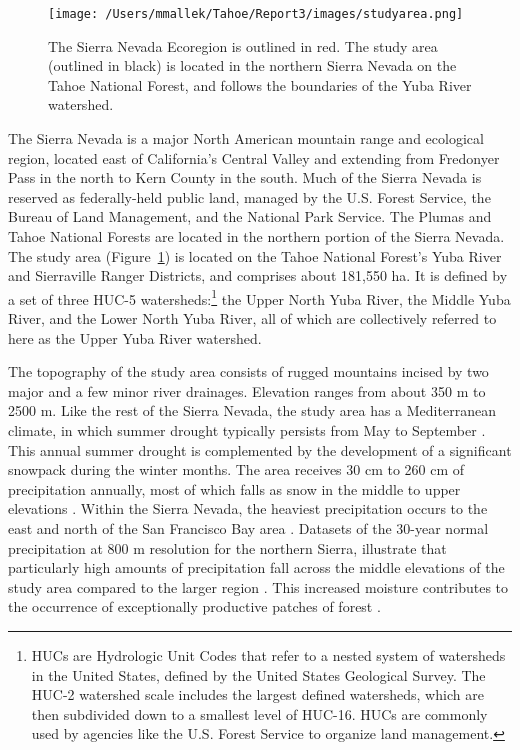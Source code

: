 \begin{figure}[!htbp]
\centering
\texttt{[image: /Users/mmallek/Tahoe/Report3/images/studyarea.png]}
\caption{The Sierra Nevada Ecoregion is outlined in red. The study area (outlined in black) is located in the northern Sierra Nevada on the Tahoe National Forest, and follows the boundaries of the Yuba River watershed.}
\label{projectarea}
\end{figure}

The Sierra Nevada is a major North American mountain range and ecological region, located east of California's Central Valley and extending from Fredonyer Pass in the north to Kern County in the south. Much of the Sierra Nevada is reserved as federally-held public land, managed by the U.S. Forest Service, the Bureau of Land Management, and the National Park Service. The Plumas and Tahoe National Forests are located in the northern portion of the Sierra Nevada. The study area (Figure~\ref{projectarea}) is located on the Tahoe National Forest's Yuba River and Sierraville Ranger Districts, and comprises about 181,550 ha. It is defined by a set of three HUC-5 watersheds:\footnote{HUCs are Hydrologic Unit Codes that refer to a nested system of watersheds in the United States, defined by the United States Geological Survey. The HUC-2 watershed scale includes the largest defined watersheds, which are then subdivided down to a smallest level of HUC-16. HUCs are commonly used by agencies like the U.S. Forest Service to organize land management.} the Upper North Yuba River, the Middle Yuba River, and the Lower North Yuba River, all of which are collectively referred to here as the Upper Yuba River watershed. 

The topography of the study area consists of rugged mountains incised by two major and a few minor river drainages. Elevation ranges from about 350 m to 2500 m. Like the rest of the Sierra Nevada, the study area has a Mediterranean climate, in which summer drought typically persists from May to September \citep{Minnich2007,Skinner1996}. This annual summer drought is complemented by the development of a significant snowpack during the winter months. The area receives 30 cm to 260 cm of precipitation annually, most of which falls as snow in the middle to upper elevations \citep{Storer1963}. Within the Sierra Nevada, the heaviest precipitation occurs to the east and north of the San Francisco Bay area \citep{VanWag2006}. Datasets of the 30-year normal precipitation at 800 m resolution for the northern Sierra, illustrate that particularly high amounts of precipitation fall across the middle elevations of the study area compared to the larger region \citep{PRISMClimateGroup2004}. This increased moisture contributes to the occurrence of exceptionally productive patches of forest \citep[][ Alan Doerr, personal communication]{Littell2012}.




